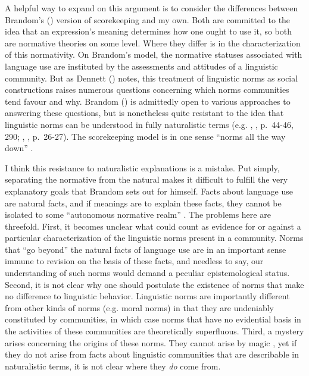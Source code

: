 A helpful way to expand on this argument is to consider the differences between Brandom's (\citeyear{Brandom:1994}) version of scorekeeping and my own. Both are committed to the idea that an expression's meaning determines how one ought to use it, so both are normative theories on some level. Where they differ is in the characterization of this normativity. On Brandom's model, the normative statuses associated with language use are instituted by the assessments and attitudes of a linguistic community. But as Dennett (\citeyear{Dennett:2010}) notes, this treatment of linguistic norms as social constructions raises numerous questions concerning which norms communities tend favour and why. Brandom (\citeyear{Brandom:2010}) is admittedly open to various approaches to answering these questions, but is nonetheless quite resistant to the idea that linguistic norms can be understood in fully naturalistic terms (e.g. \citeauthor{Brandom:1994}, \citeyear{Brandom:1994}, p.~44-46, 290; \citeauthor{Brandom:2000}, \citeyear{Brandom:2000}, p.~26-27). The scorekeeping model is in one sense ``norms all the way down'' \citep[][p. 44]{Brandom:1994}.

I think this resistance to naturalistic explanations is a mistake. Put simply, separating the normative from the natural makes it difficult to fulfill the very explanatory goals that Brandom sets out for himself. Facts about language use are natural facts, and if meanings are to explain these facts, they cannot be isolated to some ``autonomous normative realm'' \citep[][p. 133]{Horwich:2005}. The problems here are threefold. First, it becomes unclear what could count as evidence for or against a particular characterization of the linguistic norms present in a community. Norms that ``go beyond'' the natural facts of language use are in an important sense immune to revision on the basis of these facts, and needless to say, our understanding of such norms would demand a peculiar epistemological status. Second, it is not clear why one should postulate the existence of norms that make no difference to linguistic behavior. Linguistic norms are importantly different from other kinds of norms (e.g. moral norms) in that they are undeniably constituted by communities, in which case norms that have no evidential basis in the activities of these communities are theoretically superfluous. Third, a mystery arises concerning the origins of these norms. They cannot arise by magic \citep{Dennett:2010}, yet if they do not arise from facts about linguistic communities that are describable in naturalistic terms, it is not clear where they \textit{do} come from. 

